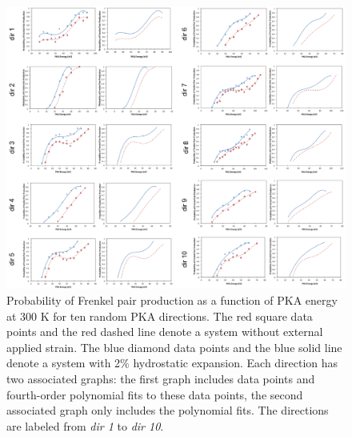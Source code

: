 \documentclass[review]{elsarticle}
\begin{document}
\begin{figure}[hp]
   \centering
   \includegraphics[width=\textwidth]{fig_all.png} %
   \caption{Probability of Frenkel pair production as a function of PKA energy at 300 K for ten random PKA directions.  The red square data points and the red dashed line denote a system without external applied strain.  The blue diamond data points and the blue solid line denote a system with 2$\%$ hydrostatic expansion.  Each direction has two associated graphs: the first graph includes data points and fourth-order polynomial fits to these data points, the second associated graph only includes the polynomial fits.  The directions are labeled from \textit{dir 1} to \textit{dir 10}.}
   \label{fig:example}
\end{figure}
\end{document}
